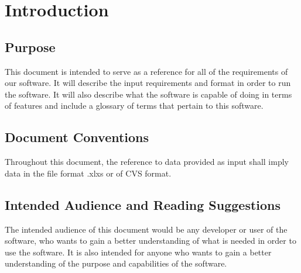 \section{Introduction}

\subsection{Purpose}

This document is intended to serve as a reference for all of the requirements of our software. It will describe the input requirements and format in order to run the software. It will also describe what the software is capable of doing in terms of features and include a glossary of terms that pertain to this software.

\subsection{Document Conventions}

Throughout this document, the reference to data provided as input shall imply data in the file format .xlxs or of CVS format.

\subsection{Intended Audience and Reading Suggestions}

The intended audience of this document would be any developer or user of the software, who wants to gain a better understanding of what is needed in order to use the software. It is also intended for anyone who wants to gain a better understanding of the purpose and capabilities of the software.

